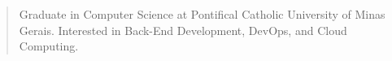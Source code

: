\begin{quote}
    Graduate in Computer Science at Pontifical Catholic University of Minas Gerais. Interested in Back-End Development, DevOps, and Cloud Computing.
\end{quote}